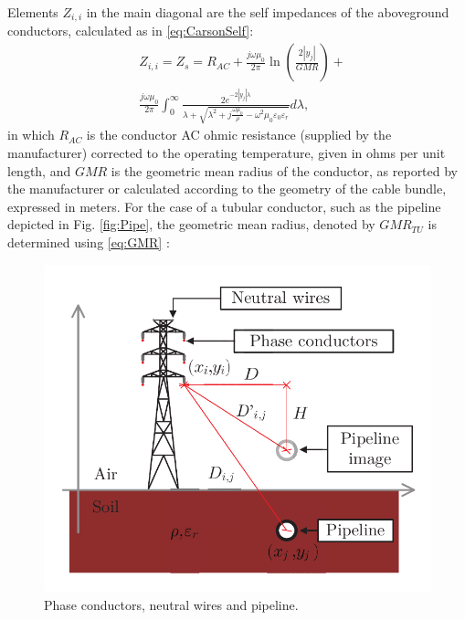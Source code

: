 \documentclass[conference]{IEEEtran}
\begin{document}
	Elements $Z_{i,i}$ in the main diagonal are the self impedances of the aboveground conductors, calculated as in \eqref{eq:CarsonSelf}:
	\begin{equation}\label{eq:CarsonSelf}
		\begin{aligned}
			&Z_{i,i}=Z_{s}=R_{AC}+\frac{j\omega\mu_{0}}{2\pi}\ln\left(\frac{2|y_j|}{GMR}\right) + \\
			&
			\frac{j\omega\mu_{0}}{2\pi}\int_{0}^{\infty}\frac{2e^{-2|y_j|\lambda}}{\lambda+\sqrt{\lambda^2+j\frac{\omega\mu_{0}}{\rho}-\omega^2\mu_{0}\varepsilon_{0}\varepsilon_{r}}} d\lambda,
		\end{aligned}
	\end{equation}
	in which $R_{AC}$ is the conductor AC ohmic resistance (supplied by the manufacturer) corrected to the operating temperature, given in ohms per unit length, and $GMR$ is the geometric mean radius of the conductor, as reported by the manufacturer or calculated according to the geometry of the cable bundle, expressed in meters. For the case of a tubular conductor, such as the pipeline depicted in Fig. \ref{fig:Pipe}, the geometric mean radius, denoted by $GMR_{TU}$ is determined using \eqref{eq:GMR} \cite{Seneff1947}:
	\begin{figure}[!t]
		\begin{center}
			\includegraphics[width=.8\columnwidth]{fig/VistaTorreDuto2.pdf}
			\caption{Phase conductors, neutral wires and pipeline.}
			\label{fig:VistaTorreDuto}
		\end{center}
	\end{figure}
\end{document}
